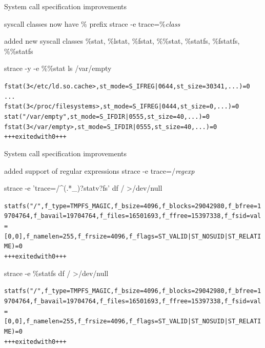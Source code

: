 \documentclass[unicode]{beamer}
\begin{document}
\begin{frame}[fragile]{System call specification improvements}
\begin{block}{\large syscall classes now have \% prefix}
strace -e trace=\%\textit{class}
\end{block}
\begin{block}{\large added new syscall classes}
\%stat, \%lstat, \%fstat, \%\%stat, \%statfs, \%fstatfs, \%\%statfs
\end{block}
\begin{block}{\large strace -y -e \%\%stat ls /var/empty}
\begin{alltt}
fstat(3</etc/ld.so.cache>, {st_mode=S_IFREG|0644, st_size=30341, ...}) = 0
...
fstat(3</proc/filesystems>, {st_mode=S_IFREG|0444, st_size=0, ...}) = 0
stat("/var/empty", {st_mode=S_IFDIR|0555, st_size=40, ...}) = 0
fstat(3</var/empty>, {st_mode=S_IFDIR|0555, st_size=40, ...}) = 0
+++ exited with 0 +++
\end{alltt}
\end{block}
\end{frame}

\begin{frame}[fragile]{System call specification improvements}
\begin{block}{\large added support of regular expressions}
strace -e trace=/\textit{regexp}
\end{block}
\begin{block}{\large strace -e 'trace=/\textasciicircum(.*\_)?statv?fs' df / >/dev/null}
\begin{alltt}
statfs("/", {f_type=TMPFS_MAGIC, f_bsize=4096, f_blocks=29042980, f_bfree=19704764, f_bavail=19704764, f_files=16501693, f_ffree=15397338, f_fsid={val=[0, 0]}, f_namelen=255, f_frsize=4096, f_flags=ST_VALID|ST_NOSUID|ST_RELATIME}) = 0
+++ exited with 0 +++
\end{alltt}
\end{block}
\begin{block}{\large strace -e \%statfs df / >/dev/null}
\begin{alltt}
statfs("/", {f_type=TMPFS_MAGIC, f_bsize=4096, f_blocks=29042980, f_bfree=19704764, f_bavail=19704764, f_files=16501693, f_ffree=15397338, f_fsid={val=[0, 0]}, f_namelen=255, f_frsize=4096, f_flags=ST_VALID|ST_NOSUID|ST_RELATIME}) = 0
+++ exited with 0 +++
\end{alltt}
\end{block}
\end{frame}
\end{document}
